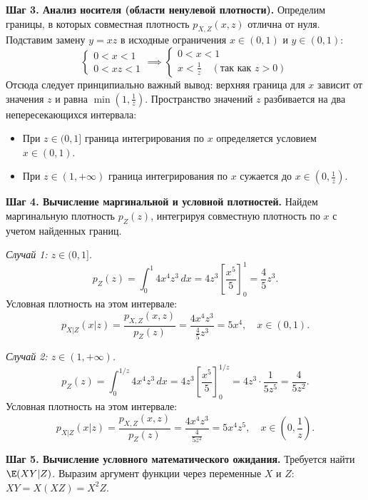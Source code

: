 \begin{Solution}
    \textbf{Шаг 3. Анализ носителя (области ненулевой плотности).}
    Определим границы, в которых совместная плотность $p_{X,Z}(x, z)$ отлична от нуля. Подставим замену $y = xz$ в исходные ограничения $x \in (0, 1)$ и $y \in (0, 1)$:
    \[
        \begin{cases}
            0 < x < 1 \\
            0 < xz < 1
        \end{cases} \implies
        \begin{cases}
            0 < x < 1 \\
            x < \frac{1}{z} \quad (\text{так как } z > 0)
        \end{cases}
    \]
    Отсюда следует принципиально важный вывод: верхняя граница для $x$ зависит от значения $z$ и равна $\min\left(1, \frac{1}{z}\right)$. Пространство значений $z$ разбивается на два непересекающихся интервала:
    \begin{itemize}
        \item При $z \in (0, 1]$ граница интегрирования по $x$ определяется условием $x \in (0, 1)$.
        \item При $z \in (1, +\infty)$ граница интегрирования по $x$ сужается до $x \in \left(0, \frac{1}{z}\right)$.
    \end{itemize}

    \textbf{Шаг 4. Вычисление маргинальной и условной плотностей.}
    Найдем маргинальную плотность $p_Z(z)$, интегрируя совместную плотность по $x$ с учетом найденных границ.

    \textit{Случай 1: $z \in (0, 1]$.}
    \[
        p_Z(z) = \int_{0}^{1} 4x^4z^3 \, dx = 4z^3 \left[ \frac{x^5}{5} \right]_0^1 = \frac{4}{5}z^3.
    \]
    Условная плотность на этом интервале:
    \[
        p_{X|Z}(x|z) = \frac{p_{X,Z}(x, z)}{p_Z(z)} = \frac{4x^4z^3}{\frac{4}{5}z^3} = 5x^4, \quad x \in (0, 1).
    \]

    \textit{Случай 2: $z \in (1, +\infty)$.}
    \[
        p_Z(z) = \int_{0}^{1/z} 4x^4z^3 \, dx = 4z^3 \left[ \frac{x^5}{5} \right]_0^{1/z} = 4z^3 \cdot \frac{1}{5z^5} = \frac{4}{5z^2}.
    \]
    Условная плотность на этом интервале:
    \[
        p_{X|Z}(x|z) = \frac{p_{X,Z}(x, z)}{p_Z(z)} = \frac{4x^4z^3}{\frac{4}{5z^2}} = 5x^4z^5, \quad x \in \left(0, \frac{1}{z}\right).
    \]

    \textbf{Шаг 5. Вычисление условного математического ожидания.}
    Требуется найти $\E(XY | Z)$. Выразим аргумент функции через переменные $X$ и $Z$: $XY = X(XZ) = X^2Z$. 
    

\end{Solution}
